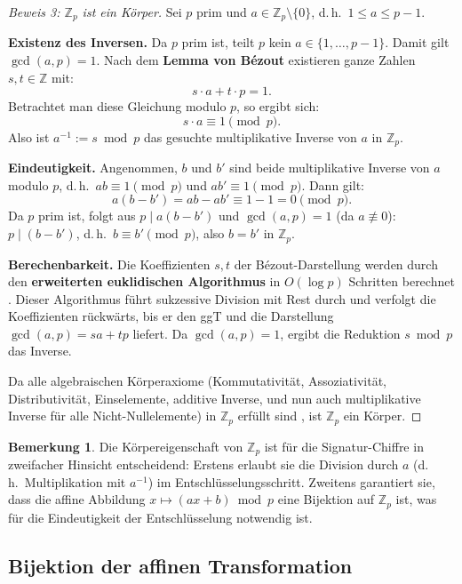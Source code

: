 ﻿\documentclass[a4paper,12pt]{scrreprt}
\theoremstyle{definition}
\newtheorem{bemerkung}{Bemerkung}[section]
\begin{document}
\begin{proof}[Beweis 3: $\mathbb{Z}_p$ ist ein Körper]
	Sei $p$ prim und $a \in \mathbb{Z}_p \setminus \{0\}$, d.\,h.\ $1 \leq a \leq p-1$.
	
	\textbf{Existenz des Inversen.} Da $p$ prim ist, teilt $p$ kein $a \in \{1,\ldots,p-1\}$. Damit gilt $\gcd(a, p) = 1$. Nach dem \textbf{Lemma von Bézout} existieren ganze Zahlen $s, t \in \mathbb{Z}$ mit:
	\[
	s \cdot a + t \cdot p = 1.
	\]
	Betrachtet man diese Gleichung modulo $p$, so ergibt sich:
	\[
	s \cdot a \equiv 1 \pmod{p}.
	\]
	Also ist $a^{-1} := s \bmod p$ das gesuchte multiplikative Inverse von $a$ in $\mathbb{Z}_p$.
	
	\textbf{Eindeutigkeit.} Angenommen, $b$ und $b'$ sind beide multiplikative Inverse von $a$ modulo $p$, d.\,h.\ $ab \equiv 1 \pmod{p}$ und $ab' \equiv 1 \pmod{p}$. Dann gilt:
	\[
	a(b - b') = ab - ab' \equiv 1 - 1 = 0 \pmod{p}.
	\]
	Da $p$ prim ist, folgt aus $p \mid a(b - b')$ und $\gcd(a, p) = 1$ (da $a \not\equiv 0$): $p \mid (b - b')$, d.\,h.\ $b \equiv b' \pmod{p}$, also $b = b'$ in $\mathbb{Z}_p$.
	
	\textbf{Berechenbarkeit.} Die Koeffizienten $s, t$ der Bézout-Darstellung werden durch den \textbf{erweiterten euklidischen Algorithmus} in $O(\log p)$ Schritten berechnet \cite{Buc16}. Dieser Algorithmus führt sukzessive Division mit Rest durch und verfolgt die Koeffizienten rückwärts, bis er den ggT und die Darstellung $\gcd(a,p) = sa + tp$ liefert. Da $\gcd(a,p) = 1$, ergibt die Reduktion $s \bmod p$ das Inverse.
	
	Da alle algebraischen Körperaxiome (Kommutativität, Assoziativität, Distributivität, Einselemente, additive Inverse, und nun auch multiplikative Inverse für alle Nicht-Nullelemente) in $\mathbb{Z}_p$ erfüllt sind \cite{KL15}, ist $\mathbb{Z}_p$ ein Körper.
\end{proof}

\begin{bemerkung}
	Die Körpereigenschaft von $\mathbb{Z}_p$ ist für die Signatur-Chiffre in zweifacher Hinsicht entscheidend: Erstens erlaubt sie die Division durch $a$ (d.\,h.\ Multiplikation mit $a^{-1}$) im Entschlüsselungsschritt. Zweitens garantiert sie, dass die affine Abbildung $x \mapsto (ax + b) \bmod p$ eine Bijektion auf $\mathbb{Z}_p$ ist, was für die Eindeutigkeit der Entschlüsselung notwendig ist.
\end{bemerkung}

\subsection{Bijektion der affinen Transformation}
\end{document}

